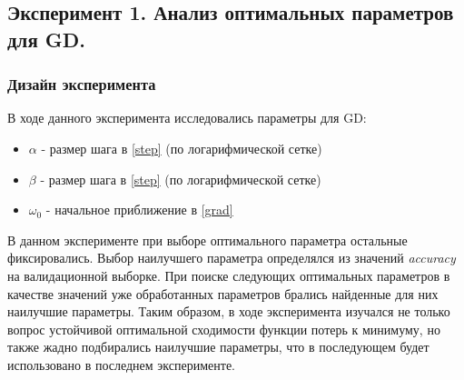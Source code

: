 \subsection{Эксперимент 1. Анализ оптимальных  параметров для GD.}
\subsubsection{Дизайн эксперимента}
В ходе данного эксперимента исследовались параметры для GD:
\begin{itemize}
	\item $\alpha$ - размер шага в \ref{step} (по логарифмической сетке)
	\item $\beta$ - размер шага в \ref{step} (по логарифмической сетке)
	\item $\omega_0$ - начальное приближение в \ref{grad}
\end{itemize}
В  данном эксперименте при выборе оптимального параметра остальные фиксировались. Выбор наилучшего параметра определялся из значений {\itshape accuracy} на валидационной выборке. При поиске следующих оптимальных параметров в качестве значений уже обработанных параметров брались найденные для них наилучшие параметры. Таким образом, в ходе эксперимента изучался не только вопрос устойчивой оптимальной сходимости функции потерь к минимуму, но также жадно подбирались наилучшие параметры, что в последующем будет использовано в последнем эксперименте. 
